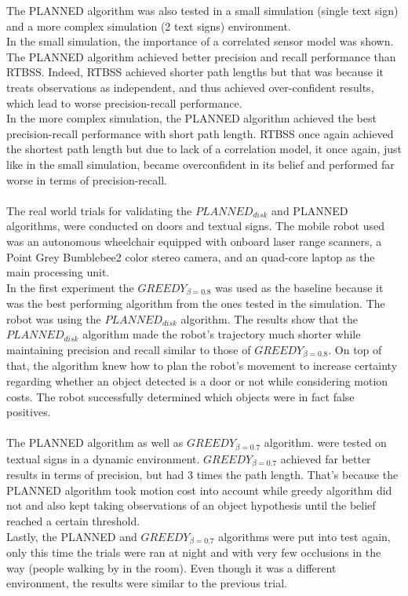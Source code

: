 \documentclass{article}
\begin{document}
	The PLANNED algorithm was also tested in a small simulation (single text sign) and a more complex simulation (2 text signs) environment. \\ 
	In the small simulation, the importance of a correlated sensor model was shown. The PLANNED algorithm achieved better precision and recall performance than RTBSS. Indeed, RTBSS achieved shorter path lengths but that was because it treats observations as independent, and thus achieved over-confident results, which lead to worse precision-recall performance.  \\
	In the more complex simulation, the PLANNED algorithm achieved the best precision-recall performance with short path length. RTBSS once again achieved the shortest path length but due to lack of a correlation model, it once again, just like in the small simulation, became overconfident in its belief and performed far worse in terms of precision-recall. \\ \\
	The real world trials for validating the $PLANNED_{disk}$ and PLANNED algorithms, were conducted on doors and textual signs.
	The mobile robot used was an autonomous wheelchair equipped with onboard laser range scanners, a Point Grey Bumblebee2 color stereo camera, and an quad-core laptop as the main processing unit. \\
	In the first experiment the $GREEDY_{\beta=0.8}$ was used as the baseline because it was the best performing algorithm from the ones tested in the simulation. The robot was using the $PLANNED_{disk}$ algorithm. The results show that the $PLANNED_{disk}$ algorithm made the robot's trajectory much shorter while maintaining precision and recall similar to those of $GREEDY_{\beta=0.8}$. On top of that, the algorithm knew how to plan the robot's movement to increase certainty regarding whether an object detected is a door or not while considering motion costs. The robot successfully determined which objects were in fact false positives. \\ \\ 
	The PLANNED algorithm as well as $GREEDY_{\beta=0.7}$ algorithm.  were tested on textual signs in a dynamic environment. $GREEDY_{\beta=0.7}$ achieved far better results in terms of precision, but had 3 times the path length. That's because the PLANNED algorithm took motion cost into account while greedy algorithm did not and also kept taking observations of an object hypothesis until the belief reached a certain threshold. \\
	Lastly, the PLANNED and $GREEDY_{\beta=0.7}$ algorithms were put into test again, only this time the trials were ran at night and with very few occlusions in the way (people walking by in the room). Even though it was a different environment, the results were similar to the previous trial. 
	 
\end{document}
